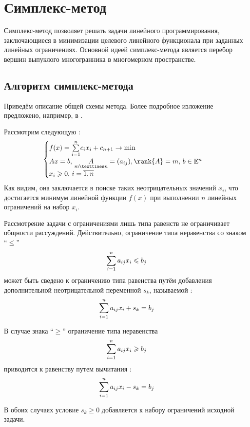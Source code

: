 \section{Симплекс-метод}
\label{sec:simplex}

Симплекс-метод позволяет решать задачи линейного программирования,
заключающиеся в минимизации целевого линейного функционала при
заданных линейных ограничениях. Основной идеей симплекс-метода
является перебор вершин выпуклого многогранника в многомерном
пространстве.

\subsection{Алгоритм симплекс-метода}

Приведём описание общей схемы метода. Более подробное изложение
предложено, например, в \cite{taha05}.

Рассмотрим следующую :
\begin{equation}
  \label{eq:lp-problem-form-initial}
  \begin{cases}
    f(x) = \suml_{i=1}^n{\! c_i x_i} + c_{n+1} \to \min \\
    Ax = b,\, \underset{m×n}{A} = (a_{ij}),\rank{A} = m,\,b \in \set{E}^n \\
    x_i \geq 0,\, i = \overline{1, n}
  \end{cases}
\end{equation}
Как видим, она заключается в поиске таких неотрицательных значений
$x_i$, что достигается минимум линейной функции $f(x)$ при выполнении
$n$ линейных ограничений на набор $x_i$.

\begin{rem}
  \label{rem:slack}
  Рассмотрение задачи с ограничениями лишь типа равенств не
  ограничивает общности рассуждений. Действительно, ограничение типа
  неравенства со знаком ``$\leq$''
  \begin{equation*}
    \sum\limits_{i=1}^n a_{ij} x_i \leqslant b_j
  \end{equation*}
  может быть сведено к ограничению типа равенства путём добавления
  дополнительной неотрицательной переменной $s_k$, называемой
  :
  \begin{equation*}
    \sum\limits_{i=1}^n a_{ij} x_i + s_k = b_j
  \end{equation*}

  В случае знака ``$\geq$'' ограничение типа неравенства
  \begin{equation*}
    \sum\limits_{i=1}^n a_{ij} x_i \geqslant b_j
  \end{equation*}
  приводится к равенству путем вычитания :
  \begin{equation*}
    \sum\limits_{i=1}^n a_{ij} x_i - s_k = b_j
  \end{equation*}

  В обоих случаях условие $s_k \geq 0$ добавляется к набору
  ограничений исходной задачи.
\end{rem}

